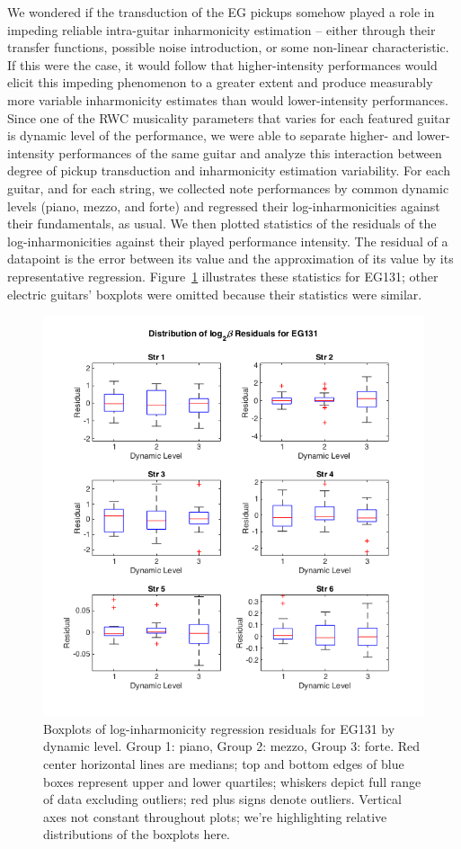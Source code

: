 \documentclass[12pt]{cmuthesis}
\begin{document}
We wondered if the transduction of the EG pickups somehow played a role in impeding reliable intra-guitar inharmonicity estimation -- either through their transfer functions, possible noise introduction, or some non-linear characteristic. If this were the case, it would follow that higher-intensity performances would elicit this impeding phenomenon to a greater extent and produce measurably more variable inharmonicity estimates than would lower-intensity performances. Since one of the RWC musicality parameters that varies for each featured guitar is dynamic level of the performance, we were able to separate higher- and lower-intensity performances of the same guitar and analyze this interaction between degree of pickup transduction and inharmonicity estimation variability. For each guitar, and for each string, we collected note performances by common dynamic levels (piano, mezzo, and forte) and regressed their log-inharmonicities against their fundamentals, as usual. We then plotted statistics of the residuals of the log-inharmonicities against their played performance intensity. The residual of a datapoint is the error between its value and the approximation of its value by its representative regression. Figure~\ref{fig:eg1-string-dyn} illustrates these statistics for EG131; other electric guitars' boxplots were omitted because their statistics were similar.
\begin{figure}[!htbp] 
\centering
\includegraphics[scale=0.75]{eg1-string-dyn}
\caption{Boxplots of log-inharmonicity regression residuals for EG131 by dynamic level. Group 1: piano, Group 2: mezzo, Group 3: forte. Red center horizontal lines are medians; top and bottom edges of blue boxes represent upper and lower quartiles; whiskers depict full range of data excluding outliers; red plus signs denote outliers. Vertical axes not constant throughout plots; we're highlighting relative distributions of the boxplots here.}
\label{fig:eg1-string-dyn}
\end{figure} 
\end{document}
